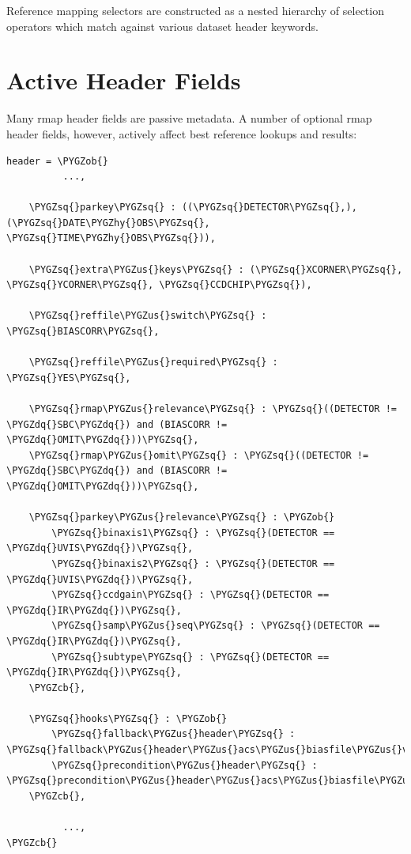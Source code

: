 \documentclass[letterpaper,10pt,english]{sphinxmanual}
\def\PYGZus{\char`\_}
\def\PYGZob{\char`\{}
\def\PYGZcb{\char`\}}
\def\PYGZhy{\char`\-}
\def\PYGZsq{\char`\'}
\def\PYGZdq{\char`\"}
\begin{document}
Reference mapping selectors are constructed as a nested hierarchy of selection operators which match against
various dataset header keywords.


\section{Active Header Fields}
\label{rmap_syntax:active-header-fields}
Many rmap header fields are passive metadata.   A number of optional rmap header fields,  however,  actively affect
best reference lookups and results:

\begin{Verbatim}[commandchars=\\\{\}]
header = \PYGZob{}
          ...,

    \PYGZsq{}parkey\PYGZsq{} : ((\PYGZsq{}DETECTOR\PYGZsq{},), (\PYGZsq{}DATE\PYGZhy{}OBS\PYGZsq{}, \PYGZsq{}TIME\PYGZhy{}OBS\PYGZsq{})),

    \PYGZsq{}extra\PYGZus{}keys\PYGZsq{} : (\PYGZsq{}XCORNER\PYGZsq{}, \PYGZsq{}YCORNER\PYGZsq{}, \PYGZsq{}CCDCHIP\PYGZsq{}),

    \PYGZsq{}reffile\PYGZus{}switch\PYGZsq{} : \PYGZsq{}BIASCORR\PYGZsq{},

    \PYGZsq{}reffile\PYGZus{}required\PYGZsq{} : \PYGZsq{}YES\PYGZsq{},

    \PYGZsq{}rmap\PYGZus{}relevance\PYGZsq{} : \PYGZsq{}((DETECTOR != \PYGZdq{}SBC\PYGZdq{}) and (BIASCORR != \PYGZdq{}OMIT\PYGZdq{}))\PYGZsq{},
    \PYGZsq{}rmap\PYGZus{}omit\PYGZsq{} : \PYGZsq{}((DETECTOR != \PYGZdq{}SBC\PYGZdq{}) and (BIASCORR != \PYGZdq{}OMIT\PYGZdq{}))\PYGZsq{},

    \PYGZsq{}parkey\PYGZus{}relevance\PYGZsq{} : \PYGZob{}
        \PYGZsq{}binaxis1\PYGZsq{} : \PYGZsq{}(DETECTOR == \PYGZdq{}UVIS\PYGZdq{})\PYGZsq{},
        \PYGZsq{}binaxis2\PYGZsq{} : \PYGZsq{}(DETECTOR == \PYGZdq{}UVIS\PYGZdq{})\PYGZsq{},
        \PYGZsq{}ccdgain\PYGZsq{} : \PYGZsq{}(DETECTOR == \PYGZdq{}IR\PYGZdq{})\PYGZsq{},
        \PYGZsq{}samp\PYGZus{}seq\PYGZsq{} : \PYGZsq{}(DETECTOR == \PYGZdq{}IR\PYGZdq{})\PYGZsq{},
        \PYGZsq{}subtype\PYGZsq{} : \PYGZsq{}(DETECTOR == \PYGZdq{}IR\PYGZdq{})\PYGZsq{},
    \PYGZcb{},

    \PYGZsq{}hooks\PYGZsq{} : \PYGZob{}
        \PYGZsq{}fallback\PYGZus{}header\PYGZsq{} : \PYGZsq{}fallback\PYGZus{}header\PYGZus{}acs\PYGZus{}biasfile\PYGZus{}v2\PYGZsq{},
        \PYGZsq{}precondition\PYGZus{}header\PYGZsq{} : \PYGZsq{}precondition\PYGZus{}header\PYGZus{}acs\PYGZus{}biasfile\PYGZus{}v2\PYGZsq{},
    \PYGZcb{},

          ...,
\PYGZcb{}
\end{Verbatim}
\end{document}
